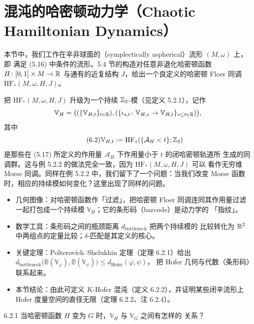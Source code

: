 \section{混沌的哈密顿动力学（Chaotic Hamiltonian Dynamics）}

本节中，我们工作在辛非球面的（symplectically aspherical）流形 $(M,\omega)$ 上，即
满足 (5.16) 中条件的流形。5.4 节的构造对任意非退化哈密顿函数
$H\colon[0,1]\times M\to\mathbb{R}$ 与通有的近复结构 $J$，给出一个良定义的哈密顿 Floer
同调 $\mathrm{HF}_*(M,\omega,H,J)$。

把 $\mathrm{HF}_*(M,\omega,H,J)$ 升级为一个持续 $\mathbb{Z}_2$-模（见定义 5.2.1），记作
\[
  \mathbb{V}_H=\bigl((\{\mathbb{V}_{H,t}\}_{t\in\mathbb{R}}),
  (\{\iota_{s,t}\colon\mathbb{V}_{H,s}\to\mathbb{V}_{H,t}\}_{s\le t\in\mathbb{R}})\bigr),
\]
其中
\begin{equation}\tag{6.2}
  \mathbb{V}_{H,t}:=\mathrm{HF}_*(\{\mathcal{A}_H<t\};\mathbb{Z}_2)
\end{equation}
是那些在 (5.17) 所定义的作用量 $\mathcal{A}_H$ 下作用量小于 $t$ 的闭哈密顿轨道所
生成的同调群。这与例 5.2.2 的做法完全一致，因为 $\mathrm{HF}_*(M,\omega,H,J)$ 可以
看作无穷维 Morse 同调。同样在例 5.2.2 中，我们留下了一个问题：当我们改变 Morse
函数时，相应的持续模如何变化？这里出现了同样的问题。

\begin{keytakeaways}
\begin{itemize}
  \item 几何图像：对哈密顿函数作「过滤」，把哈密顿 Floer 同调连同其作用量过滤
        一起打包成一个持续模 $\mathbb{V}_H$；它的条形码（barcode）是动力学的
        「指纹」。
  \item 数学工具：条形码之间的瓶颈距离 $d_{\mathrm{bottleneck}}$ 把两个持续模的
        比较转化为 $\mathbb{R}^2$ 中两组点的定量比较；$\delta$-匹配是其定义的核心。
  \item 关键定理：Polterovich--Shelukhin 定理（定理 6.2.1）给出
        $d_{\mathrm{bottleneck}}\bigl(\mathbb{B}(\mathbb{V}_\varphi),
        \mathbb{B}(\mathbb{V}_\psi)\bigr)\le d_{\mathrm{Hofer}}(\varphi,\psi)$，
        把 Hofer 几何与代数（条形码）联系起来。
  \item 本节结论：由此可定义 $K$-Hofer 混沌（定义 6.2.2），并证明某些闭辛流形上
        Hofer 度量空间的直径无限（定理 6.2.2、注 6.2.4）。
\end{itemize}
\end{keytakeaways}

\begin{wque}{6.2.1}
  当哈密顿函数 $H$ 变为 $G$ 时，$\mathbb{V}_H$ 与 $\mathbb{V}_G$ 之间有怎样的
  关系？
\end{wque}

